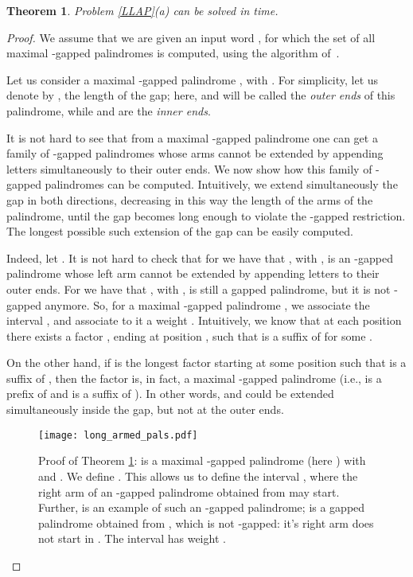 \documentclass[final]{dmtcs-episciences}
\newtheorem{theorem}{Theorem}
\begin{document}
\begin{theorem}\label{proof_LLAP}
Problem \ref{LLAP}(a) can be solved in  time.
\end{theorem}
\begin{proof}
We assume that we are given an input word , for which the set  of all maximal -gapped palindromes is computed, using the algorithm of~\cite{STACS2016}. 

Let us consider a maximal -gapped palindrome , with . For simplicity, let us denote by , the length of the gap; here,  and  will be called the {\em outer ends} of this palindrome, while  and  are the {\em inner ends}. 

It is not hard to see that from a maximal -gapped palindrome one can get a family of -gapped palindromes whose arms cannot be extended by appending letters simultaneously to their outer ends. We now show how this family of -gapped palindromes can be computed. Intuitively, we extend simultaneously the gap in both directions, decreasing in this way the length of the arms of the palindrome, until the gap becomes long enough to violate the -gapped restriction. The longest possible such extension of the gap can be easily computed. 

Indeed, let . It is not hard to check that for  we have that , with , is an -gapped palindrome whose left arm cannot be extended by appending letters to their outer ends. For  we have that , with , is still a gapped palindrome, but it is not -gapped anymore.  So, for a maximal -gapped palindrome , we associate the interval , and associate to it a weight . Intuitively, we know that at each position  there exists a factor , ending at position , such that  is a suffix of  for some . 

On the other hand, if  is the longest factor starting at some position  such that  is a suffix of , then the factor  is, in fact, a maximal -gapped palindrome (i.e.,  is a prefix of  and  is a suffix of ). In other words,  and  could be extended simultaneously inside the gap, but not at the outer ends.

\begin{figure}
\begin{center}
\texttt{[image: long\_armed\_pals.pdf]}
\end{center}
\vspace{-0.5cm}
\caption{Proof of Theorem \ref{proof_LLAP}:  is a maximal -gapped palindrome (here ) with  and . We define . This allows us to define the interval , where the right arm of an -gapped palindrome obtained from  may start. Further,  is an example of such an -gapped palindrome;  is a gapped palindrome obtained from , which is not -gapped: it's right arm does not start in .
The interval  has weight .}
\end{figure}
 

\end{proof}
\end{document}
